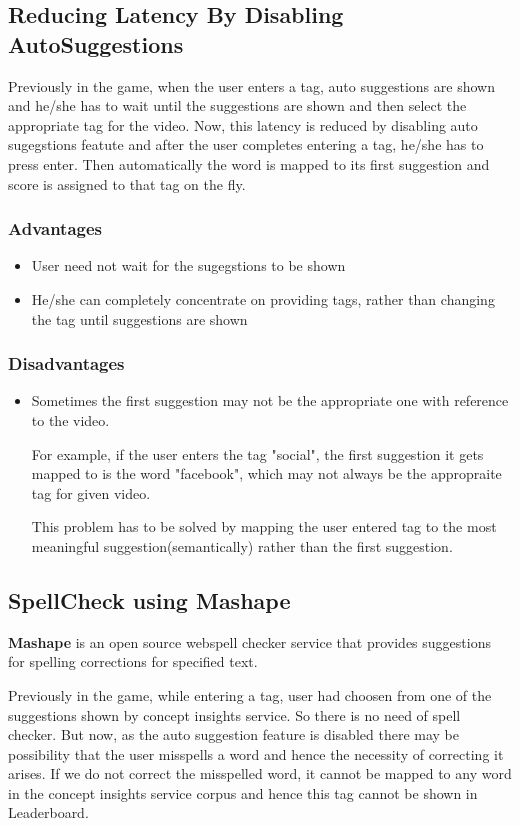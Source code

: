 \documentclass[12pt]{article}
\begin{document}
\subsection{Reducing Latency By Disabling AutoSuggestions} 
Previously in the game, when the user enters a tag, auto suggestions are shown and he/she has to wait until the suggestions are shown and then select the appropriate tag for the video. Now, this latency is reduced by disabling auto sugegstions featute and after the user completes entering a tag, he/she has to press enter. Then automatically the word is mapped to its first suggestion and score is assigned to that tag on the fly.

\subsubsection{Advantages}
\begin{itemize}
\item User need not wait for the sugegstions to be shown
\item He/she can completely concentrate on providing tags, rather than changing the tag until suggestions are shown
\end{itemize}

\subsubsection{Disadvantages} 
\begin{itemize}
\item Sometimes the first suggestion may not be the appropriate one with reference to the video.\

For example, if the user enters the tag "social", the first suggestion it gets mapped to is the word "facebook", which may not always be the appropraite tag for given video.\

This problem has to be solved by mapping the user entered tag to the most meaningful suggestion(semantically) rather than the first suggestion.
\end{itemize}

\subsection{SpellCheck using Mashape\cite{i1}}

\textbf{Mashape\cite{i1} } is an open source webspell checker service that provides suggestions for spelling corrections for specified text.

Previously in the game, while entering a tag, user had choosen from one of the suggestions shown by concept insights service. So there is no need of spell checker.
But now, as the auto suggestion feature is disabled there may be possibility that the user misspells a word and hence the necessity of correcting it arises. If we do not correct the misspelled word, it cannot be mapped to any word in the concept insights service corpus and hence this tag cannot be shown in Leaderboard.    
\end{document}
